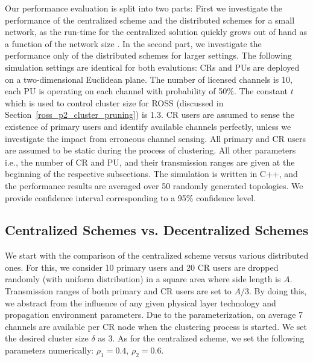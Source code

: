 \documentclass[times]{ettauth}
\newcommand{\ie}{i.e., }
\theoremstyle{mytheoremstyle}
\theoremstyle{mytheoremstyle}
\theoremstyle{mytheoremstyle}
\begin{document}
Our performance evaluation is split into two parts:
First we investigate the performance of the centralized scheme and the distributed schemes for a small network, as the run-time for the centralized solution quickly grows out of hand as a function of the network size .
In the second part, we investigate the performance only of the distributed schemes for larger settings.
The following simulation settings are identical for both evalutions:
CRs and PUs are deployed on a two-dimensional Euclidean plane.
The number of licensed channels is 10, each PU is operating on each channel with probability of 50\%.
The constant $t$ which is used to control cluster size for ROSS (discussed in Section~\ref{ross_p2_cluster_pruning}) is 1.3.
CR users are assumed to sense the existence of primary users and identify available channels perfectly, unless we investigate the impact from erroneous channel sensing.
All primary and CR users are assumed to be static during the process of clustering.
All other parameters \ie the number of CR and PU, and their transmission ranges are given at the beginning of the respective subsections.
The simulation is written in C++, and the performance results are averaged over 50 randomly generated topologies.
We provide confidence interval corresponding to a 95\% confidence level.

\subsection{Centralized Schemes vs. Decentralized Schemes}
We start with the comparison of the centralized scheme versus various distributed ones.
For this, we consider 10 primary users and 20 CR users are dropped randomly (with uniform distribution) in a square area where side length is $A$.
Transmission ranges of both primary and CR users are set to $A/3$.
By doing this, we abstract from the influence of any given physical layer technology and propagation environment parameters.
Due to the parameterization, on average 7 channels are available per CR node when the clustering process is started.
We set the desired cluster size $\delta$ as 3.
As for the centralized scheme, we set the following parameters numerically: $\rho_1 =  0.4$, $\rho_2 =  0.6$.
\end{document}
